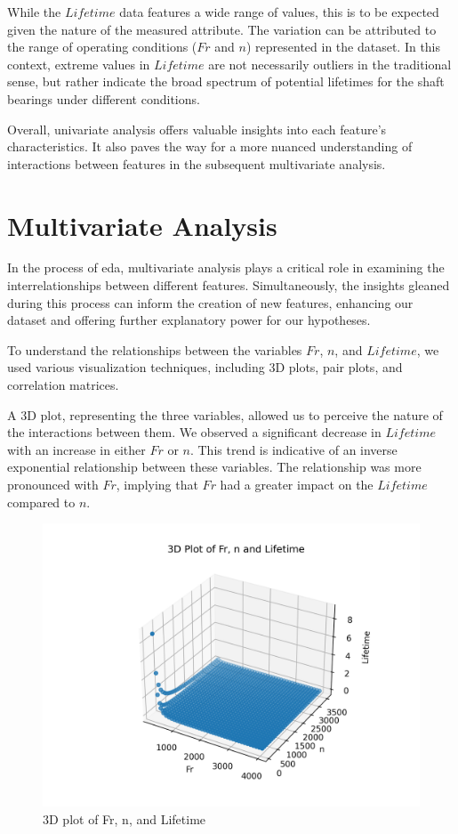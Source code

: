 While the \(Lifetime\) data features a wide range of values, this is to be expected given the nature of the measured attribute. The variation can be attributed to the range of operating conditions (\(Fr\) and \(n\)) represented in the dataset. In this context, extreme values in \(Lifetime\) are not necessarily outliers in the traditional sense, but rather indicate the broad spectrum of potential lifetimes for the shaft bearings under different conditions.

Overall, univariate analysis offers valuable insights into each feature's characteristics. It also paves the way for a more nuanced understanding of interactions between features in the subsequent multivariate analysis.


\section{Multivariate Analysis}

In the process of \ac{eda}, multivariate analysis plays a critical role in examining the interrelationships between different features. Simultaneously, the insights gleaned during this process can inform the creation of new features, enhancing our dataset and offering further explanatory power for our hypotheses.

To understand the relationships between the variables \(Fr\), \(n\), and \(Lifetime\), we used various visualization techniques, including 3D plots, pair plots, and correlation matrices.

A 3D plot, representing the three variables, allowed us to perceive the nature of the interactions between them. We observed a significant decrease in \(Lifetime\) with an increase in either \(Fr\) or \(n\). This trend is indicative of an inverse exponential relationship between these variables. The relationship was more pronounced with \(Fr\), implying that \(Fr\) had a greater impact on the \(Lifetime\) compared to \(n\).

\begin{figure}[ht]
    \centering
    \includegraphics[width=\textwidth]{assets/bearings-eda/3dplot.png}
    \caption{3D plot of Fr, n, and Lifetime}
    \label{fig:bearings-3dplot}
\end{figure}

